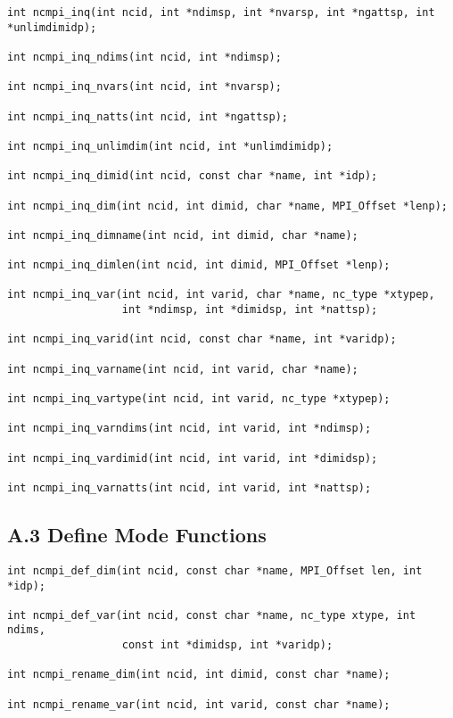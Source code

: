 \documentclass[10pt]{article}
\begin{document}
\begin{verbatim}
int ncmpi_inq(int ncid, int *ndimsp, int *nvarsp, int *ngattsp, int *unlimdimidp); 

int ncmpi_inq_ndims(int ncid, int *ndimsp);

int ncmpi_inq_nvars(int ncid, int *nvarsp);

int ncmpi_inq_natts(int ncid, int *ngattsp);

int ncmpi_inq_unlimdim(int ncid, int *unlimdimidp);

int ncmpi_inq_dimid(int ncid, const char *name, int *idp);

int ncmpi_inq_dim(int ncid, int dimid, char *name, MPI_Offset *lenp);

int ncmpi_inq_dimname(int ncid, int dimid, char *name);

int ncmpi_inq_dimlen(int ncid, int dimid, MPI_Offset *lenp);

int ncmpi_inq_var(int ncid, int varid, char *name, nc_type *xtypep, 
                  int *ndimsp, int *dimidsp, int *nattsp);

int ncmpi_inq_varid(int ncid, const char *name, int *varidp);

int ncmpi_inq_varname(int ncid, int varid, char *name);

int ncmpi_inq_vartype(int ncid, int varid, nc_type *xtypep);

int ncmpi_inq_varndims(int ncid, int varid, int *ndimsp);

int ncmpi_inq_vardimid(int ncid, int varid, int *dimidsp);

int ncmpi_inq_varnatts(int ncid, int varid, int *nattsp);

\end{verbatim}

%
%
\subsection*{A.3  Define Mode Functions}

\begin{verbatim}
int ncmpi_def_dim(int ncid, const char *name, MPI_Offset len, int *idp);

int ncmpi_def_var(int ncid, const char *name, nc_type xtype, int ndims, 
                  const int *dimidsp, int *varidp);

int ncmpi_rename_dim(int ncid, int dimid, const char *name);

int ncmpi_rename_var(int ncid, int varid, const char *name);

\end{verbatim}
%
%
\end{document}
